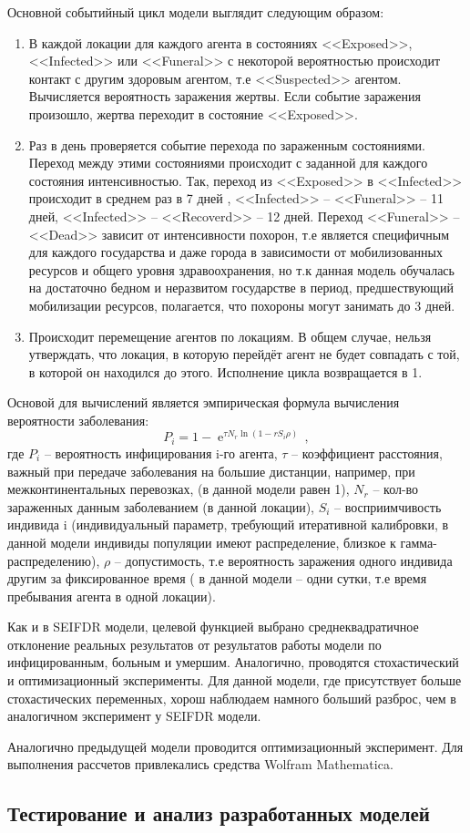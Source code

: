Основной событийный цикл модели выглядит следующим образом:
\begin{enumerate}
	\item В каждой локации для каждого агента в состояниях <<Exposed>>, <<Infected>> или <<Funeral>>  с некоторой вероятностью происходит контакт с другим   здоровым агентом, т.е <<Suspected>> агентом. Вычисляется вероятность заражения жертвы. Если событие заражения произошло, жертва переходит в состояние <<Exposed>>.
	\item Раз в день проверяется событие перехода по зараженным состояниями. Переход между этими состояниями происходит с заданной для каждого состояния интенсивностью. Так, переход из <<Exposed>> в <<Infected>> происходит в среднем раз в 7 дней %
	,  <<Infected>> -- <<Funeral>> -- 11 дней, <<Infected>> -- <<Recoverd>> -- 12 дней. Переход <<Funeral>> -- <<Dead>> зависит от интенсивности похорон, т.е является специфичным для каждого государства и даже города в зависимости от мобилизованных ресурсов и общего уровня здравоохранения, но т.к данная модель обучалась на достаточно бедном и неразвитом государстве в период, предшествующий мобилизации ресурсов, полагается, что похороны могут занимать до 3 дней. 
	\item Происходит перемещение агентов по локациям. В общем случае, нельзя утверждать, что локация, в которую перейдёт агент не будет совпадать с той, в которой он находился до этого. Исполнение цикла возвращается в 1. 
\end{enumerate}

Основой для вычислений является эмпирическая формула  вычисления вероятности заболевания:
\begin{equation}\label{stohastic_eq:1}
P_i = 1 - \operatorname{e}^{\tau N_r \ln(1-rS_i\rho)} \,,
\end{equation}
где $P_i$ -- вероятность инфицирования  i-го агента, $\tau$  -- коэффициент расстояния, важный при передаче заболевания на большие дистанции, например, при межконтинентальных перевозках, (в данной модели равен 1), $N_r$ -- кол-во зараженных данным заболеванием (в данной локации), $S_i$ -- восприимчивость индивида i (индивидуальный параметр, требующий итеративной калибровки, в данной модели индивиды популяции имеют распределение, близкое к гамма-распределению), $\rho$ -- допустимость, т.е вероятность заражения одного индивида другим за фиксированное время ( в данной модели -- одни сутки, т.е время пребывания агента в одной локации).

Как и в SEIFDR модели, целевой функцией выбрано среднеквадратичное отклонение реальных результатов от результатов работы модели по инфицированным, больным и умершим. Аналогично, проводятся стохастический и оптимизационный эксперименты. 
Для данной модели, где присутствует больше стохастических переменных, хорош наблюдаем намного больший разброс, чем в аналогичном эксперимент у SEIFDR модели.

Аналогично предыдущей модели проводится оптимизационный эксперимент. Для выполнения рассчетов привлекались средства Wolfram Mathematica.

\subsection{Тестирование и анализ разработанных моделей}
